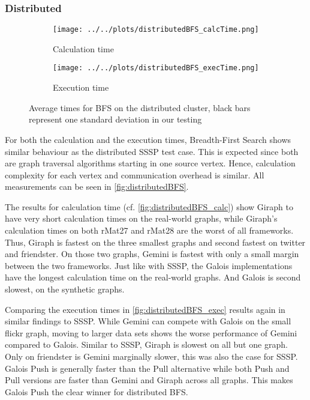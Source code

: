 \subsubsection{Distributed}
\begin{figure*}
	\hfil
	\begin{subfigure}{0.32\textwidth}
		\texttt{[image: ../../plots/distributedBFS\_calcTime.png]}
		\caption{Calculation time}
		\label{fig:distributedBFS_calc}
	\end{subfigure}
	\hfil
	\begin{subfigure}{0.32\textwidth}
		\texttt{[image: ../../plots/distributedBFS\_execTime.png]}
		\caption{Execution time}
		\label{fig:distributedBFS_exec}
	\end{subfigure}
	\hfil
	\caption{Average times for BFS on the distributed cluster, black bars represent one standard deviation in our testing}
	\label{fig:distributedBFS}
\end{figure*}
For both the calculation and the execution times, Breadth-First Search shows similar behaviour as the distributed SSSP test case. This is expected since both are graph traversal algorithms starting in one source vertex.
Hence, calculation complexity for each vertex and communication overhead is similar. All measurements can be seen in \autoref{fig:distributedBFS}.

The results for calculation time (cf. \autoref{fig:distributedBFS_calc}) show Giraph to have very short calculation times on the real-world graphs, while Giraph's calculation times on both rMat27 and rMat28 are the worst of all frameworks. Thus, Giraph is fastest on the three smallest graphs and second fastest on twitter and friendster. On those two graphs, Gemini is fastest with only a small margin between the two frameworks.
Just like with SSSP, the Galois implementations have the longest calculation time on the real-world graphs. And Galois is second slowest, on the synthetic graphs.

Comparing the execution times in \autoref{fig:distributedBFS_exec} results again in similar findings to SSSP.
While Gemini can compete with Galois on the small flickr graph, moving to larger data sets shows the worse performance of Gemini compared to Galois.
Similar to SSSP, Giraph is slowest on all but one graph. Only on friendster is Gemini marginally slower, this was also the case for SSSP.
Galois Push is generally faster than the Pull alternative while both Push and Pull versions are faster than Gemini and Giraph across all graphs.
This makes Galois Push the clear winner for distributed BFS.

